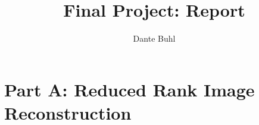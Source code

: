\documentclass{article}
\title{Final Project: Report}
\author{Dante Buhl}
\begin{document}
\newcommand{\bs}[1]{\boldsymbol{#1}}
\newcommand{\bmp}[1]{\begin{minipage}{#1\textwidth}}
\newcommand{\emp}{\end{minipage}}
\newcommand{\R}{\mathbb{R}}
\newcommand{\C}{\mathbb{C}}
\newcommand{\N}{\mathcal{N}}
\newcommand{\I}{\mathrm{I}}
\newcommand{\K}{\bs{\mathrm{K}}}
\newcommand{\m}{\bs{\mu}_*}
\newcommand{\s}{\bs{\Sigma}_*}
\newcommand{\dt}{\Delta t}
\newcommand{\tr}[1]{\text{Tr}(#1)}
\newcommand{\Tr}[1]{\text{Tr}(#1)}

\maketitle



\section{Part A: Reduced Rank Image Reconstruction}
\end{document}

